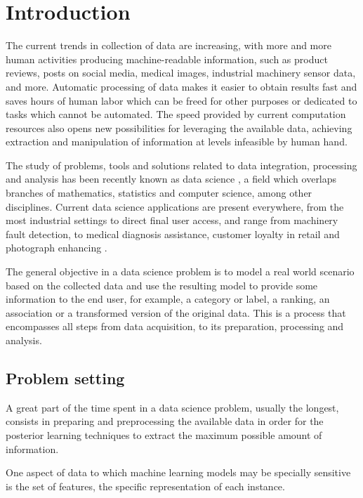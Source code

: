 \setchapterpreamble[u]{\margintoc}
\chapter{Introduction}


The current trends in collection of data are increasing, with more and more human activities producing machine-readable information, such as product reviews, posts on social media, medical images, industrial machinery sensor data,  and more. Automatic processing of data makes it easier to obtain  results fast and saves hours of human labor which can be freed for other purposes or dedicated to tasks which cannot be automated. The speed provided by current computation resources also opens new possibilities for leveraging the available data, achieving extraction and manipulation of information at levels infeasible by human hand.

The study of problems, tools and solutions related to data integration, processing and analysis has been recently known as data science , a field which overlaps branches of mathematics, statistics and computer science, among other disciplines. Current data science applications are present everywhere, from the most industrial settings to direct final user access, and range from machinery fault detection, to medical diagnosis assistance, customer loyalty in retail and photograph enhancing .

The general objective in a data science problem is to model a real world scenario based on the collected data and use the resulting model to provide some information to the end user, for example, a category or label, a ranking, an association or a transformed version of the original data. This is a process that encompasses all steps from data acquisition, to its preparation, processing and analysis.

\section{Problem setting}

A great part of the time spent in a data science problem, usually the longest, consists in preparing and preprocessing the available data in order for the posterior learning techniques to extract the maximum possible amount of information.

One aspect of data to which machine learning  models may be specially sensitive is the set of features, the specific representation of each instance.

